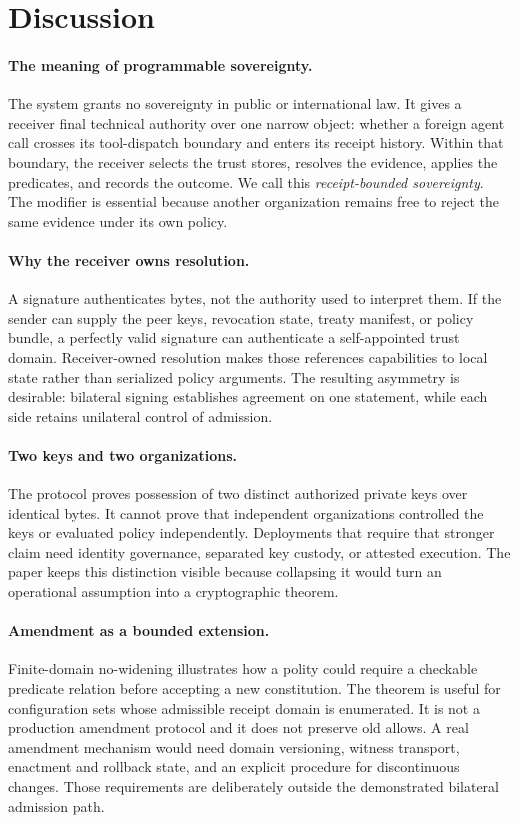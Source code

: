 \section{Discussion}
\label{sec:discussion}

\paragraph{The meaning of programmable sovereignty.}
The system grants no sovereignty in public or international law. It gives a
receiver final technical authority over one narrow object: whether a foreign
agent call crosses its tool-dispatch boundary and enters its receipt history.
Within that boundary, the receiver selects the trust stores, resolves the
evidence, applies the predicates, and records the outcome. We call this
\emph{receipt-bounded sovereignty}. The modifier is essential because another
organization remains free to reject the same evidence under its own policy.

\paragraph{Why the receiver owns resolution.}
A signature authenticates bytes, not the authority used to interpret them. If
the sender can supply the peer keys, revocation state, treaty manifest, or
policy bundle, a perfectly valid signature can authenticate a self-appointed
trust domain. Receiver-owned resolution makes those references capabilities
to local state rather than serialized policy arguments. The resulting
asymmetry is desirable: bilateral signing establishes agreement on one
statement, while each side retains unilateral control of admission.

\paragraph{Two keys and two organizations.}
The protocol proves possession of two distinct authorized private keys over
identical bytes. It cannot prove that independent organizations controlled the
keys or evaluated policy independently. Deployments that require that stronger
claim need identity governance, separated key custody, or attested execution.
The paper keeps this distinction visible because collapsing it would turn an
operational assumption into a cryptographic theorem.

\paragraph{Amendment as a bounded extension.}
Finite-domain no-widening illustrates how a polity could require a checkable
predicate relation before accepting a new constitution. The theorem is useful
for configuration sets whose admissible receipt domain is enumerated. It is
not a production amendment protocol and it does not preserve old allows. A
real amendment mechanism would need domain versioning, witness transport,
enactment and rollback state, and an explicit procedure for discontinuous
changes. Those requirements are deliberately outside the demonstrated
bilateral admission path.

